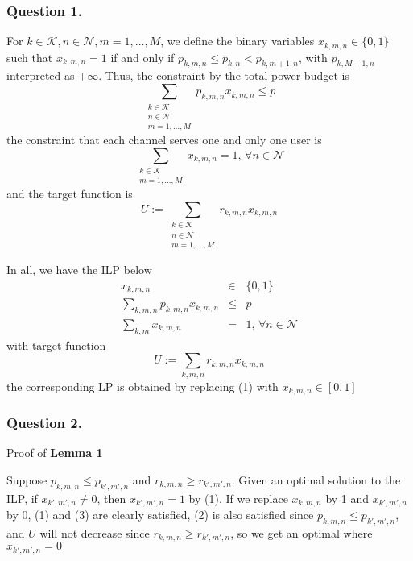 \documentclass[10pt, oneside]{report}
\begin{document}
\subsubsection{Question 1.} For $k\in\mathcal{K}, n\in\mathcal{N}, m=1,\dots,M$, we define the binary variables $x_{k,m,n}\in\{0,1\}$ such that $x_{k,m,n}=1$ if and only if $p_{k,m,n}\le p_{k,n}<p_{k,m+1,n}$, with $p_{k,M+1,n}$ interpreted as $+\infty$. Thus, the constraint by the total power budget is
$$
\sum_{\substack{k\in\mathcal{K}\\n\in\mathcal{N}\\m=1,\dots,M}}p_{k,m,n}x_{k,m,n}\le p
$$
the constraint that each channel serves one and only one user is
$$
\sum_{\substack{k\in\mathcal{K}\\m=1,\dots,M}}x_{k,m,n}=1, \, \forall n\in\mathcal{N}
$$
and the target function is
$$
U:=\sum_{\substack{k\in\mathcal{K}\\n\in\mathcal{N}\\m=1,\dots,M}}r_{k,m,n}x_{k,m,n}
$$

In all, we have the ILP below
\begin{eqnarray}
x_{k,m,n}&\in&\{0,1\} \\
\sum_{k,m,n}p_{k,m,n}x_{k,m,n}&\le& p \\
\sum_{k,m}x_{k,m,n}&=&1, \, \forall n\in\mathcal{N}
\end{eqnarray}
with target function
$$
U:=\sum_{k,m,n}r_{k,m,n}x_{k,m,n}
$$
the corresponding LP is obtained by replacing (1) with $x_{k,m,n}\in[0,1]$

\subsubsection{Question 2.} Proof of \textbf{Lemma 1}

Suppose $p_{k,m,n}\le p_{k',m',n}$ and $r_{k,m,n}\ge r_{k',m',n}$. Given an optimal solution to the ILP, if $x_{k',m',n}\ne0$, then $x_{k',m',n}=1$ by (1). If we replace $x_{k,m,n}$ by 1 and $x_{k',m',n}$ by 0, (1) and (3) are clearly satisfied, (2) is also satisfied since $p_{k,m,n}\le p_{k',m',n}$, and $U$ will not decrease since $r_{k,m,n}\ge r_{k',m',n}$, so we get an optimal where $x_{k',m',n}=0$

\hspace{1em}
\end{document}
